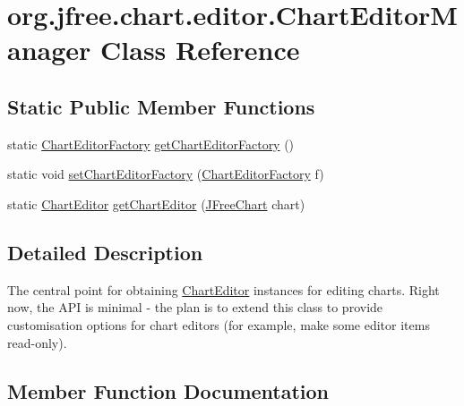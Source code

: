 \hypertarget{classorg_1_1jfree_1_1chart_1_1editor_1_1_chart_editor_manager}{}\section{org.\+jfree.\+chart.\+editor.\+Chart\+Editor\+Manager Class Reference}
\label{classorg_1_1jfree_1_1chart_1_1editor_1_1_chart_editor_manager}
\subsection*{Static Public Member Functions}
\begin{DoxyCompactItemize}
\item 
static \mbox{\hyperlink{interfaceorg_1_1jfree_1_1chart_1_1editor_1_1_chart_editor_factory}{Chart\+Editor\+Factory}} \mbox{\hyperlink{classorg_1_1jfree_1_1chart_1_1editor_1_1_chart_editor_manager_ac8b452e09e624ece012381d03b482c8b}{get\+Chart\+Editor\+Factory}} ()
\item 
static void \mbox{\hyperlink{classorg_1_1jfree_1_1chart_1_1editor_1_1_chart_editor_manager_a2131eb6717fb849bd6e92f0fac64097b}{set\+Chart\+Editor\+Factory}} (\mbox{\hyperlink{interfaceorg_1_1jfree_1_1chart_1_1editor_1_1_chart_editor_factory}{Chart\+Editor\+Factory}} f)
\item 
static \mbox{\hyperlink{interfaceorg_1_1jfree_1_1chart_1_1editor_1_1_chart_editor}{Chart\+Editor}} \mbox{\hyperlink{classorg_1_1jfree_1_1chart_1_1editor_1_1_chart_editor_manager_a3d910d06da2e0dd6877fa46d876a44f4}{get\+Chart\+Editor}} (\mbox{\hyperlink{classorg_1_1jfree_1_1chart_1_1_j_free_chart}{J\+Free\+Chart}} chart)
\end{DoxyCompactItemize}


\subsection{Detailed Description}
The central point for obtaining \mbox{\hyperlink{interfaceorg_1_1jfree_1_1chart_1_1editor_1_1_chart_editor}{Chart\+Editor}} instances for editing charts. Right now, the A\+PI is minimal -\/ the plan is to extend this class to provide customisation options for chart editors (for example, make some editor items read-\/only). 

\subsection{Member Function Documentation}
\mbox{\label{classorg_1_1jfree_1_1chart_1_1editor_1_1_chart_editor_manager_a3d910d06da2e0dd6877fa46d876a44f4}} 

